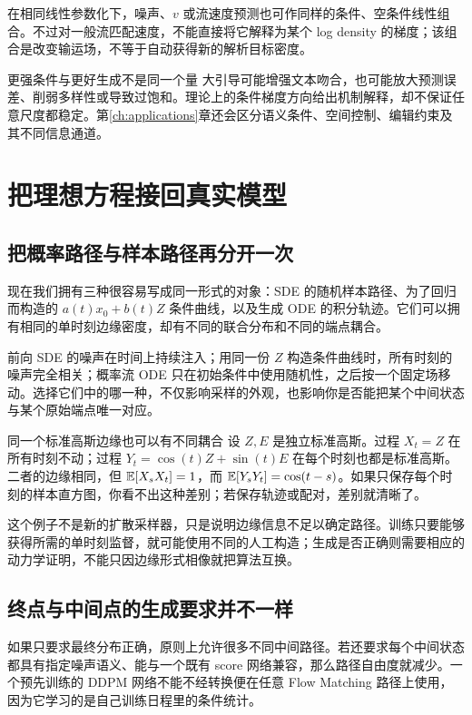 在相同线性参数化下，噪声、$v$ 或流速度预测也可作同样的条件、空条件线性组合。不过对一般流匹配速度，不能直接将它解释为某个 log density 的梯度；该组合是改变输运场，不等于自动获得新的解析目标密度。

\begin{cautionbox}{更强条件与更好生成不是同一个量}
大引导可能增强文本吻合，也可能放大预测误差、削弱多样性或导致过饱和。理论上的条件梯度方向给出机制解释，却不保证任意尺度都稳定。第\ref{ch:applications}章还会区分语义条件、空间控制、编辑约束及其不同信息通道。
\end{cautionbox}

\section{把理想方程接回真实模型}
\subsection{把概率路径与样本路径再分开一次}
现在我们拥有三种很容易写成同一形式的对象：SDE 的随机样本路径、为了回归而构造的 $a(t)x_0+b(t)Z$ 条件曲线，以及生成 ODE 的积分轨迹。它们可以拥有相同的单时刻边缘密度，却有不同的联合分布和不同的端点耦合。

前向 SDE 的噪声在时间上持续注入；用同一份 $Z$ 构造条件曲线时，所有时刻的噪声完全相关；概率流 ODE 只在初始条件中使用随机性，之后按一个固定场移动。选择它们中的哪一种，不仅影响采样的外观，也影响你是否能把某个中间状态与某个原始端点唯一对应。

\begin{examplebox}{同一个标准高斯边缘也可以有不同耦合}
设 $Z,E$ 是独立标准高斯。过程 $X_t=Z$ 在所有时刻不动；过程 $Y_t=\cos(t)Z+\sin(t)E$ 在每个时刻也都是标准高斯。二者的边缘相同，但
$\mathbb{E}[X_sX_t]=1$，而 $\mathbb{E}[Y_sY_t]=\cos(t-s)$。如果只保存每个时刻的样本直方图，你看不出这种差别；若保存轨迹或配对，差别就清晰了。
\end{examplebox}

这个例子不是新的扩散采样器，只是说明边缘信息不足以确定路径。训练只要能够获得所需的单时刻监督，就可能使用不同的人工构造；生成是否正确则需要相应的动力学证明，不能只因边缘形式相像就把算法互换。

\subsection{终点与中间点的生成要求并不一样}
如果只要求最终分布正确，原则上允许很多不同中间路径。若还要求每个中间状态都具有指定噪声语义、能与一个既有 score 网络兼容，那么路径自由度就减少。一个预先训练的 DDPM 网络不能不经转换便在任意 Flow Matching 路径上使用，因为它学习的是自己训练日程里的条件统计。

